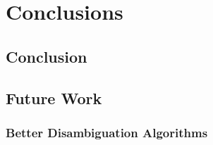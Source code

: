 \documentclass[12pt, a4paper]{report}
\begin{document}


\chapter{Conclusions}

\section{Conclusion}

\section{Future Work}


\subsection{Better Disambiguation Algorithms}
\label{subsec_better_disambiguation_algorithms}







\end{document}
